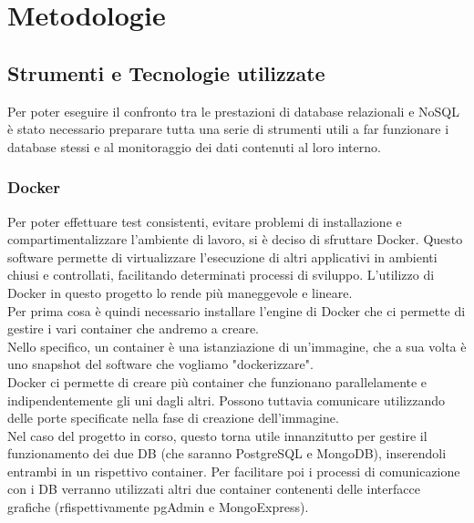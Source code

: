 
\chapter{Metodologie}
\label{cap:metodologie}


\section{Strumenti e Tecnologie utilizzate}
Per poter eseguire il confronto tra le prestazioni di database relazionali e NoSQL è stato necessario preparare tutta una serie di strumenti utili a far funzionare i database stessi e al monitoraggio dei dati contenuti al loro interno.

\subsection{Docker}
Per poter effettuare test consistenti, evitare problemi di installazione e compartimentalizzare l'ambiente di lavoro, si è deciso di sfruttare Docker. Questo software permette di virtualizzare l'esecuzione di altri applicativi in ambienti chiusi e controllati, facilitando determinati processi di sviluppo. L'utilizzo di Docker in questo progetto lo rende più maneggevole e lineare.\\
Per prima cosa è quindi necessario installare l'engine di Docker che ci permette di gestire i vari container che andremo a creare.\\
Nello specifico, un container è una istanziazione di un'immagine, che a sua volta è uno snapshot del software che vogliamo "dockerizzare".\\
Docker ci permette di creare più container che funzionano parallelamente e indipendentemente gli uni dagli altri. Possono tuttavia comunicare utilizzando delle porte specificate nella fase di creazione dell'immagine.\\
Nel caso del progetto in corso, questo torna utile innanzitutto per gestire il funzionamento dei due DB (che saranno PostgreSQL e MongoDB), inserendoli entrambi in un rispettivo container.
Per facilitare poi i processi di comunicazione con i DB verranno utilizzati altri due container contenenti delle interfacce grafiche (rfispettivamente pgAdmin e MongoExpress).

